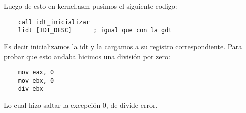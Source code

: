 \noindent Luego de esto en kernel.asm pusimos el siguiente codigo:

\begin{codesnippet}
\begin{verbatim}
    call idt_inicializar
    lidt [IDT_DESC]      ; igual que con la gdt
\end{verbatim}
\end{codesnippet}

\noindent Es decir inicializamos la idt y la cargamos a su registro correspondiente. Para probar que esto andaba hicimos una división por zero:

\begin{codesnippet}
\begin{verbatim}
    mov eax, 0
    mov ebx, 0
    div ebx
\end{verbatim}
\end{codesnippet}

\noindent Lo cual hizo saltar la excepción 0, de divide error.